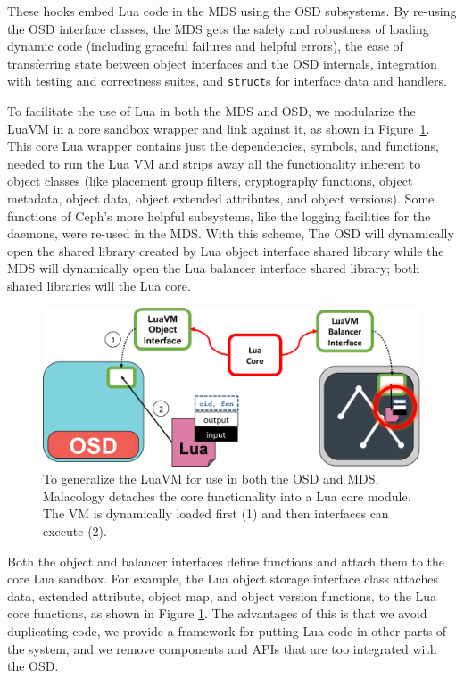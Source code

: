 \documentclass[10pt,twocolumn]{article}
\begin{document}
These hooks embed Lua code in the MDS using the
OSD subsystems. By re-using the OSD interface classes, the MDS gets the safety and robustness of loading dynamic code (including graceful failures and helpful errors), the ease of transferring state between object
interfaces and the OSD internals, integration with testing and
correctness suites, and \texttt{struct}s for interface data and
handlers. 

To facilitate the use of Lua in both the MDS and OSD, we modularize the LuaVM in a core sandbox wrapper and link against it, as shown in Figure~\ref{fig:cls-osd-mds}. This core Lua wrapper contains
just the dependencies, symbols, and functions, needed to run the Lua VM and strips away all the functionality inherent to object classes (like placement group filters, cryptography functions, object metadata,  object data, object extended attributes, and object versions). Some functions of Ceph's more helpful subsystems, like the logging facilities for the daemons, were re-used in the MDS.  With this scheme, The OSD will dynamically open the shared library created by Lua object interface shared library while the MDS will dynamically open the Lua balancer interface shared
library; both shared libraries will the Lua core.

\begin{figure}[htbp]
\centering
\includegraphics{figures/cls-osd-mds.png}
\caption{To generalize the LuaVM for use in both the OSD and MDS,
Malacology detaches the core functionality into a Lua core module. The
VM is dynamically loaded first (1) and then interfaces can execute (2).
\label{fig:cls-osd-mds}}
\end{figure}

Both the object and balancer interfaces define functions and attach them
to the core Lua sandbox. For example, the Lua object storage interface
class attaches data, extended attribute, object map, and object version
functions, to the Lua core functions, as shown in Figure
\ref{fig:cls-osd-mds}. The advantages of this is that we avoid
duplicating code, we provide a framework for putting Lua code in other
parts of the system, and we remove components and APIs that are too
integrated with the OSD.
\end{document}
